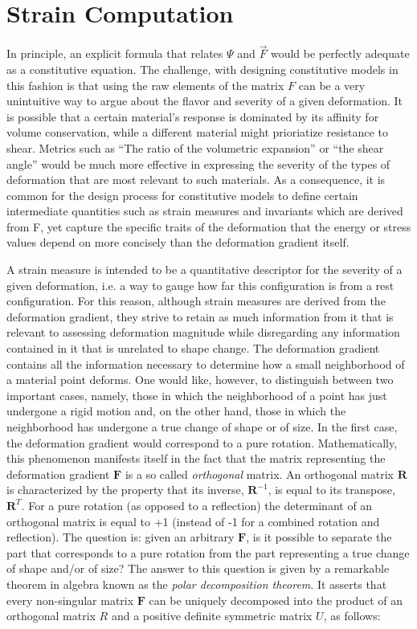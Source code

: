 \section{Strain Computation}
In principle, an explicit formula that relates $\Psi$ and $\vec{F}$ would be perfectly adequate as a constitutive equation. The challenge, with designing
constitutive models in this fashion is that using the raw elements of the matrix $F$ can be a very unintuitive way to argue about the flavor and severity
of a given deformation. It is possible that a certain material's response is dominated by its affinity for volume conservation, while a different material
might prioriatize resistance to shear. Metrics such as ``The ratio of the volumetric expansion'' or ``the shear angle'' would be much more effective in 
expressing the severity of the types of deformation that are most relevant to such materials. As a consequence, it is common for the design process for 
constitutive models to define certain intermediate quantities such as strain measures and invariants which are derived from F, yet capture the specific 
traits of the deformation that the energy or stress values depend on more concisely than the deformation gradient itself.


A strain measure is intended to be a quantitative descriptor for the severity of a given deformation, i.e. a way to gauge how far this configuration is 
from a rest configuration. For this reason, although strain measures are derived from the deformation gradient, they strive to retain as much information 
from it that is relevant to assessing deformation magnitude while disregarding any information contained in it that is unrelated to shape change. 
The deformation gradient contains all the information necessary to determine how a small neighborhood of a material point deforms. One would like, 
however, to distinguish between two important cases, namely, those in which the neighborhood of a point has just undergone a rigid motion and, on the other 
hand, those in which the neighborhood has undergone a true change of shape or of size. In the first case, the deformation gradient would correspond to a 
pure rotation. Mathematically, this phenomenon manifests itself in the fact that the matrix representing the deformation gradient $\mathbf{F}$ is a so called
\textit{orthogonal} matrix. An orthogonal matrix $\mathbf{R}$ is characterized by the property that its inverse, $\mathbf{R}^{-1}$, is equal to its transpose,
$\mathbf{R}^T$. For a pure rotation (as opposed to a reflection) the determinant of an orthogonal matrix is equal to +1 (instead of -1 for a combined rotation
and reflection). The question is: given an arbitrary $\mathbf{F}$, is it possible to separate the part that corresponds to a pure rotation from the part 
representing a true change of shape and/or of size? The answer to this question is given by a remarkable theorem in algebra known as the 
\textit{polar decomposition theorem}. It asserts that every non-singular matrix $\mathbf{F}$ can be uniquely decomposed into the product of an orthogonal 
matrix $R$ and a positive definite symmetric matrix $U$, as follows:

